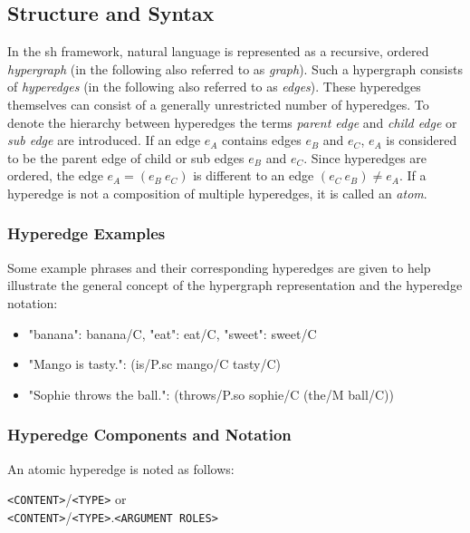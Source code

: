 \documentclass[11pt, numbers=noenddot]{scrreprt}
\begin{document}
\subsection{Structure and Syntax}
In the \gls{sh} framework, natural language is represented as a recursive, ordered \textit{hypergraph} (in the following also referred to as \textit{graph}). Such a hypergraph consists of \textit{hyperedges} (in the following also referred to as \textit{edges}). These hyperedges themselves can consist of a generally unrestricted number of hyperedges. To denote the hierarchy between hyperedges the terms \textit{parent edge} and \textit{child edge} or \textit{sub edge} are introduced. If an edge \(e_A\) contains edges \(e_B\) and \(e_C\), \(e_A\) is considered to be the parent edge of child or sub edges \(e_B\) and \(e_C\). Since hyperedges are ordered, the edge \(e_A = (e_B \ e_C)\) is different to an edge \((e_C \  e_B) \neq e_A\). If a hyperedge is not a composition of multiple hyperedges, it is called an \textit{atom}.


\subsubsection{Hyperedge Examples}
Some example phrases and their corresponding hyperedges are given to help illustrate the general concept of the hypergraph representation and the hyperedge notation:

\begin{itemize}
	\item "banana": \textsf{banana/C}, "eat": \textsf{eat/C}, "sweet": \textsf{sweet/C}
	\item "Mango is tasty.": \textsf{(is/P.sc mango/C tasty/C)}
	\item "Sophie throws the ball.": \textsf{(throws/P.so sophie/C (the/M ball/C))}
\end{itemize}


\subsubsection{Hyperedge Components and Notation}
\label{sec:hyperedge-notation}
An atomic hyperedge is noted as follows:

\begin{center}
	\texttt{<CONTENT>}\textsf{/}\texttt{<TYPE>} or \\
	\texttt{<CONTENT>}\textsf{/}\texttt{<TYPE>}\textsf{.}\texttt{<ARGUMENT ROLES>}
\end{center}
\end{document}
